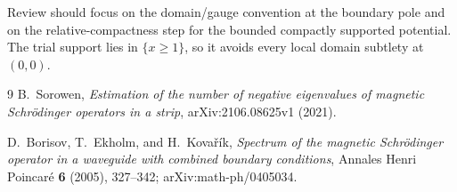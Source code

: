 \documentclass[11pt]{article}
\begin{document}
Review should focus on the domain/gauge convention at the boundary pole and
on the relative-compactness step for the bounded compactly supported
potential.  The trial support lies in $\{x\ge1\}$, so it avoids every local
domain subtlety at $(0,0)$.

\begin{thebibliography}{9}
B.~Sorowen,
\emph{Estimation of the number of negative eigenvalues of magnetic
Schrödinger operators in a strip},
arXiv:2106.08625v1 (2021).

D.~Borisov, T.~Ekholm, and H.~Kovařík,
\emph{Spectrum of the magnetic Schrödinger operator in a waveguide with
combined boundary conditions},
Annales Henri Poincaré \textbf{6} (2005), 327--342;
arXiv:math-ph/0405034.
\end{thebibliography}
\end{document}
